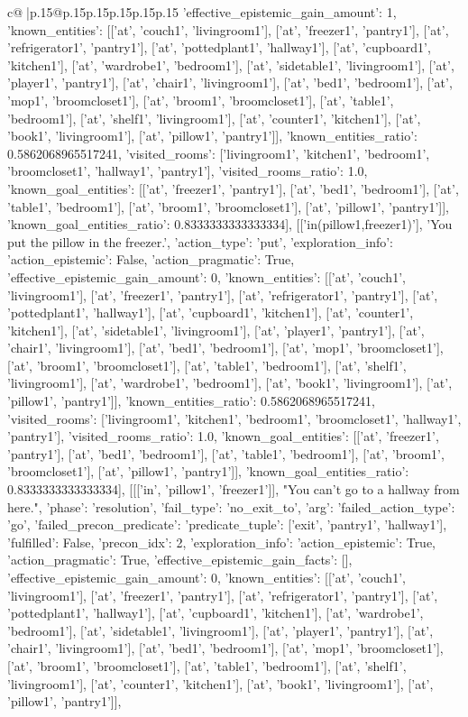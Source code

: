\documentclass{article}
\begin{document}
{\begin{supertabular}{c@{$\;$}|p{.15\linewidth}@{}p{.15\linewidth}p{.15\linewidth}p{.15\linewidth}p{.15\linewidth}p{.15\linewidth}}
{{{'effective_epistemic_gain_amount': 1, 'known_entities': [['at', 'couch1', 'livingroom1'], ['at', 'freezer1', 'pantry1'], ['at', 'refrigerator1', 'pantry1'], ['at', 'pottedplant1', 'hallway1'], ['at', 'cupboard1', 'kitchen1'], ['at', 'wardrobe1', 'bedroom1'], ['at', 'sidetable1', 'livingroom1'], ['at', 'player1', 'pantry1'], ['at', 'chair1', 'livingroom1'], ['at', 'bed1', 'bedroom1'], ['at', 'mop1', 'broomcloset1'], ['at', 'broom1', 'broomcloset1'], ['at', 'table1', 'bedroom1'], ['at', 'shelf1', 'livingroom1'], ['at', 'counter1', 'kitchen1'], ['at', 'book1', 'livingroom1'], ['at', 'pillow1', 'pantry1']], 'known_entities_ratio': 0.5862068965517241, 'visited_rooms': ['livingroom1', 'kitchen1', 'bedroom1', 'broomcloset1', 'hallway1', 'pantry1'], 'visited_rooms_ratio': 1.0, 'known_goal_entities': [['at', 'freezer1', 'pantry1'], ['at', 'bed1', 'bedroom1'], ['at', 'table1', 'bedroom1'], ['at', 'broom1', 'broomcloset1'], ['at', 'pillow1', 'pantry1']], 'known_goal_entities_ratio': 0.8333333333333334}}], [['in(pillow1,freezer1)'], 'You put the pillow in the freezer.', {'action_type': 'put', 'exploration_info': {'action_epistemic': False, 'action_pragmatic': True, 'effective_epistemic_gain_amount': 0, 'known_entities': [['at', 'couch1', 'livingroom1'], ['at', 'freezer1', 'pantry1'], ['at', 'refrigerator1', 'pantry1'], ['at', 'pottedplant1', 'hallway1'], ['at', 'cupboard1', 'kitchen1'], ['at', 'counter1', 'kitchen1'], ['at', 'sidetable1', 'livingroom1'], ['at', 'player1', 'pantry1'], ['at', 'chair1', 'livingroom1'], ['at', 'bed1', 'bedroom1'], ['at', 'mop1', 'broomcloset1'], ['at', 'broom1', 'broomcloset1'], ['at', 'table1', 'bedroom1'], ['at', 'shelf1', 'livingroom1'], ['at', 'wardrobe1', 'bedroom1'], ['at', 'book1', 'livingroom1'], ['at', 'pillow1', 'pantry1']], 'known_entities_ratio': 0.5862068965517241, 'visited_rooms': ['livingroom1', 'kitchen1', 'bedroom1', 'broomcloset1', 'hallway1', 'pantry1'], 'visited_rooms_ratio': 1.0, 'known_goal_entities': [['at', 'freezer1', 'pantry1'], ['at', 'bed1', 'bedroom1'], ['at', 'table1', 'bedroom1'], ['at', 'broom1', 'broomcloset1'], ['at', 'pillow1', 'pantry1']], 'known_goal_entities_ratio': 0.8333333333333334}}], [[['in', 'pillow1', 'freezer1']], "You can't go to a hallway from here.", {'phase': 'resolution', 'fail_type': 'no_exit_to', 'arg': {'failed_action_type': 'go', 'failed_precon_predicate': {'predicate_tuple': ['exit', 'pantry1', 'hallway1'], 'fulfilled': False, 'precon_idx': 2}}, 'exploration_info': {'action_epistemic': True, 'action_pragmatic': True, 'effective_epistemic_gain_facts': [], 'effective_epistemic_gain_amount': 0, 'known_entities': [['at', 'couch1', 'livingroom1'], ['at', 'freezer1', 'pantry1'], ['at', 'refrigerator1', 'pantry1'], ['at', 'pottedplant1', 'hallway1'], ['at', 'cupboard1', 'kitchen1'], ['at', 'wardrobe1', 'bedroom1'], ['at', 'sidetable1', 'livingroom1'], ['at', 'player1', 'pantry1'], ['at', 'chair1', 'livingroom1'], ['at', 'bed1', 'bedroom1'], ['at', 'mop1', 'broomcloset1'], ['at', 'broom1', 'broomcloset1'], ['at', 'table1', 'bedroom1'], ['at', 'shelf1', 'livingroom1'], ['at', 'counter1', 'kitchen1'], ['at', 'book1', 'livingroom1'], ['at', 'pillow1', 'pantry1']], }}}
\end{supertabular}}
\end{document}
